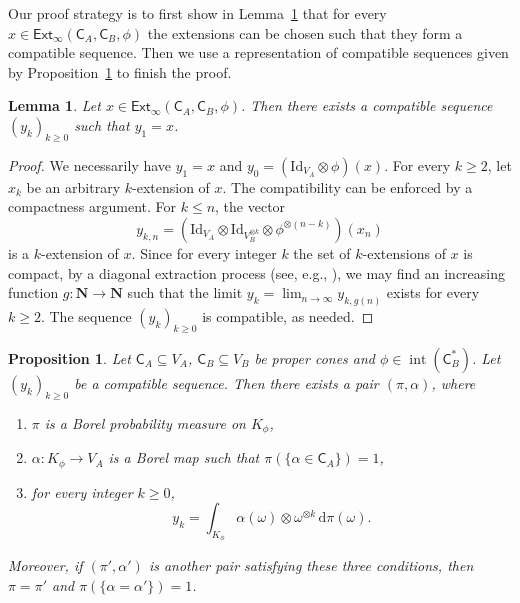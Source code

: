 \documentclass{amsart}
\newcommand{\iy}{\infty}
\renewcommand{\leq}{\leqslant}
\renewcommand{\geq}{\geqslant}
\renewcommand{\subset}{\subseteq}
\newcommand{\gC}{\mathsf{C}}
\newcommand{\N}{\mathbf{N}}
\newcommand{\Id}{\mathrm{Id}}
\newcommand{\Ext}{\mathsf{Ext}}
\DeclareMathOperator{\inter}{int}
\theoremstyle{plain}
\newtheorem{proposition}[theorem]{Proposition}
\newtheorem{lemma}[theorem]{Lemma}
\newcommand{\out}[1]{\textcolor{red}{#1}}
\begin{document}
Our proof strategy is to first show in Lemma~\ref{lemma:compatible-extension} that for every $x \in \Ext_{\iy}(\gC_A,\gC_B,\phi)$ the extensions can be chosen such that they form a compatible sequence. Then we use a representation of compatible sequences given by Proposition~\ref{proposition:main-compatible-extensions} to finish the proof.

\begin{lemma} \label{lemma:compatible-extension}
Let $x \in \Ext_{\iy}(\gC_A,\gC_B,\phi)$. Then there exists a compatible sequence $(y_k)_{k \geq 0}$ such that $y_1=x$.
\end{lemma}

\begin{proof}
We necessarily have $y_1=x$ and $y_0 = (\Id_{V_A} \otimes \phi)(x)$. For every $k \geq 2$, let $x_k$ be an arbitrary $k$-extension of $x$. The compatibility can be enforced by a compactness argument. For $k \leq n$, the vector 
\[ y_{k,n} = ( \Id_{V_A} \otimes \Id_{V_B^{\otimes k}} \otimes  \phi^{\otimes (n-k)} )(x_n) \]
is a $k$-extension of $x$. Since for every integer $k$ the set of $k$-extensions of $x$ is compact, by a diagonal extraction process (see, e.g., \cite[Theorem I.24]{ReedSimon72}), we may find an increasing function $g : \N \to \N$ such that the limit $y_k = \lim_{n \to \infty} y_{k,g(n)}$ exists for every $k \geq 2$. The sequence $(y_k)_{k \geq 0}$ is compatible, as needed.
\end{proof}


\begin{proposition} \label{proposition:main-compatible-extensions}
Let $\gC_A \subset V_A$, $\gC_B \subset V_B$ be proper cones and $\phi \in \inter( \gC_B^*)$. Let $(y_k)_{k \geq 0}$ be a compatible sequence. Then there exists a pair $(\pi,\alpha)$, where
\begin{enumerate}
    \item[(i)] $\pi$ is a Borel probability measure on $K_\phi$,
    \item[(ii)] $\alpha : K_\phi \to V_A$ is a Borel map such that $\pi(\{ \alpha \in \gC_A\})=1$,
    \item[(iii)] for every integer $k \geq 0$,
\begin{equation}
\label{eq:main-compatible-extensions}
y_k = \int_{K_\phi} \alpha(\omega) \otimes \omega^{\otimes k} \, \mathrm{d} \pi(\omega). \end{equation}
\end{enumerate}
Moreover, if $(\pi',\alpha')$ is another pair satisfying these three conditions, then $\pi=\pi'$ and $\pi(\{\alpha=\alpha'\})=1$.
\end{proposition}
\end{document}
